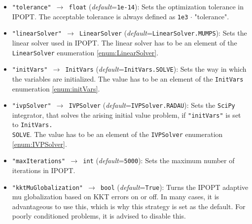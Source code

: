 \documentclass[12pt]{article}
\begin{document}
\begin{mdframed}[backgroundcolor=gray!10, roundcorner=10pt,
		linewidth=1pt]

	\begin{itemize}

		\label{flag:tolerance}
		\item \texttt{"tolerance" $\rightarrow$ float}
		      (\emph{default}=\texttt{1e-14}): Sets the optimization
		      tolerance in IPOPT. The
		      acceptable tolerance is always defined as \texttt{1e3}
		      $\cdot$ "tolerance".

		      \label{flag:linearSolver}
		\item \texttt{"linearSolver" $\rightarrow$ LinearSolver}
		      (\emph{default}=\texttt{LinearSolver.MUMPS}): Sets the
		      linear solver used in
		      IPOPT. The linear solver has to be an element of the
		      \texttt{LinearSolver}
		      enumeration \eqref{enum:LinearSolver}.

		      \label{flag:initVars}
		\item \texttt{"initVars" $\rightarrow$ InitVars}
		      (\emph{default}=\texttt{InitVars.SOLVE}): Sets the way in
		      which the variables
		      are initialized. The value has to be an element of the
		      \texttt{InitVars}
		      enumeration \eqref{enum:initVars}.

		      \label{flag:ivpSolver}
		\item \texttt{"ivpSolver" $\rightarrow$ IVPSolver}
		      (\emph{default}=\texttt{IVPSolver.RADAU}): Sets the
		      \texttt{SciPy} integrator,
		      that solves the arising initial value problem, if
		      \texttt{"initVars"} is set to
		      \texttt{InitVars.\\SOLVE}. The value has to be an element
		      of the
		      \texttt{IVPSolver} enumeration \eqref{enum:IVPSolver}.

		      \label{flag:maxIterations}
		\item \texttt{"maxIterations" $\rightarrow$ int}
		      (\emph{default}=\texttt{5000}): Sets the maximum
		      number of iterations in IPOPT.

			\label{flag:kktmuglobalization}
			\item \texttt{"kktMuGlobalization" $\rightarrow$ bool}
			(\emph{default}=\texttt{True}): Turns the IPOPT adaptive mu globalization based on KKT errors on or off. In many cases, it is advantageous to use this, which is why this strategy is set as the default. For poorly conditioned problems, it is advised to disable this.


\end{itemize}
\end{mdframed}
\end{document}
